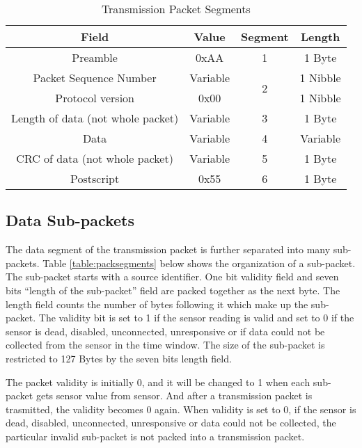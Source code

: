 \begin{table}[H]
    \centering
    {
    \begin{tabular}{|c|c|c|c|}
        \hline
        \rowcolor{black!8}
        \textbf{Field} & \textbf{Value} & \textbf{Segment} & \textbf{Length}\\
        \hline
        Preamble & 0xAA & 1 & 1 Byte\\ \hline
        Packet Sequence Number & Variable & \multirow{2}{*}{2} & 1 Nibble\\ \cline{1-2} \cline{4-4}
        Protocol version & 0x00 &  & 1 Nibble\\ \hline
        Length of data (not whole packet) & Variable & 3 & 1 Byte\\ \hline
        Data & Variable & 4 & Variable \\ \hline
        CRC of data (not whole packet) & Variable & 5 & 1 Byte\\ \hline
        Postscript & 0x55 & 6 & 1 Byte\\ \hline
    \end{tabular}
    }
    \caption{Transmission Packet Segments}
    \label{table:seg}
\end{table}


\subsection{Data Sub-packets} \label{ssec:sub-pack}

The data segment of the transmission packet is further separated into many
sub-packets. Table \ref{table:packsegments} below shows the organization
of a sub-packet.
The sub-packet starts with a source identifier. One bit
validity field and seven bits ``length of the sub-packet'' field
are packed together as the next byte. The length field counts the number of
bytes following it which make up the sub-packet. 
The validity bit is set to 1 if the sensor reading is valid and set to 0 if the sensor
is dead, disabled, unconnected, unresponsive or if data could not be collected
from the sensor in the time window. The size of the sub-packet is restricted to 127 Bytes by the seven bits length field.
\par
The packet validity is initially 0, and it will be changed to 1 when each sub-packet gets sensor value from sensor. 
And after a transmission packet is trasmitted, the validity becomes 0 again. 
When validity is set to 0, if the sensor is dead, disabled, unconnected, unresponsive or data could not be collected,
the particular invalid sub-packet is not packed into a transmission packet.
\\

